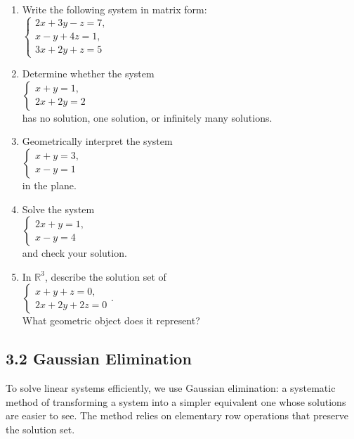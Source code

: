 \documentclass[
  12pt,
  a4paper,
]{article}
\begin{document}
\begin{enumerate}
\def\labelenumi{\arabic{enumi}.}
\item
  Write the following system in matrix form:\\
  \(
  \begin{cases}
  2x + 3y - z = 7, \\
  x - y + 4z = 1, \\
  3x + 2y + z = 5
  \end{cases}
  \)
\item
  Determine whether the system\\
  \(
  \begin{cases}
  x + y = 1, \\
  2x + 2y = 2
  \end{cases}
  \)\\
  has no solution, one solution, or infinitely many solutions.
\item
  Geometrically interpret the system\\
  \(
  \begin{cases}
  x + y = 3, \\
  x - y = 1
  \end{cases}
  \)\\
  in the plane.
\item
  Solve the system\\
  \(
  \begin{cases}
  2x + y = 1, \\
  x - y = 4
  \end{cases}
  \)\\
  and check your solution.
\item
  In \(\mathbb{R}^3\), describe the solution set of\\
  \(
  \begin{cases}
  x + y + z = 0, \\
  2x + 2y + 2z = 0
  \end{cases}
  \).\\
  What geometric object does it represent?
\end{enumerate}

\subsection{3.2 Gaussian Elimination}\label{32-gaussian-elimination}

To solve linear systems efficiently, we use Gaussian elimination: a
systematic method of transforming a system into a simpler equivalent one
whose solutions are easier to see. The method relies on elementary row
operations that preserve the solution set.
\end{document}
